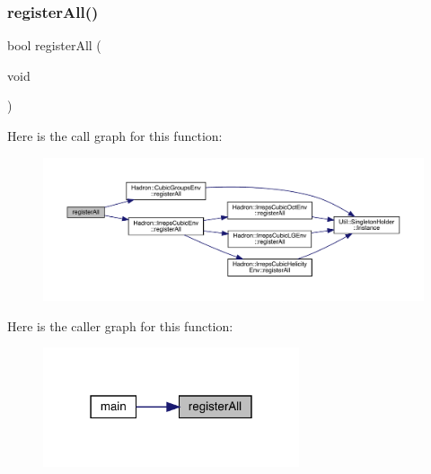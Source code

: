 \subsubsection{\texorpdfstring{registerAll()}{registerAll()}}
{\footnotesize\ttfamily bool register\+All (\begin{DoxyParamCaption}\item[{void}]{ }\end{DoxyParamCaption})}

Here is the call graph for this function\+:
\nopagebreak
\begin{figure}[H]
\begin{center}
\leavevmode
\includegraphics[width=350pt]{d7/d18/adat-devel_2main_2irreputils_2num__embed__check_8cc_a3872416cf70cb24d7da1008a3f3b1d96_cgraph}
\end{center}
\end{figure}
Here is the caller graph for this function\+:
\nopagebreak
\begin{figure}[H]
\begin{center}
\leavevmode
\includegraphics[width=214pt]{d7/d18/adat-devel_2main_2irreputils_2num__embed__check_8cc_a3872416cf70cb24d7da1008a3f3b1d96_icgraph}
\end{center}
\end{figure}
